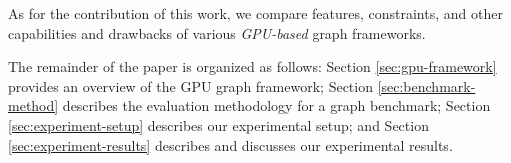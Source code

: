 As for the contribution of this work, we compare features, constraints, and other capabilities and drawbacks of various \emph{GPU-based} graph frameworks.

The remainder of the paper is organized as follows: Section \ref{sec:gpu-framework} provides an overview of the GPU graph framework; Section \ref{sec:benchmark-method} describes the evaluation methodology for a graph benchmark; Section \ref{sec:experiment-setup} describes our experimental setup; and Section \ref{sec:experiment-results} describes and discusses our experimental results.





